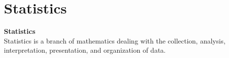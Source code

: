 \section{Statistics}
\textbf{Statistics} \\
Statistics is a branch of mathematics dealing with the collection, analysis, interpretation, presentation, and organization of data.